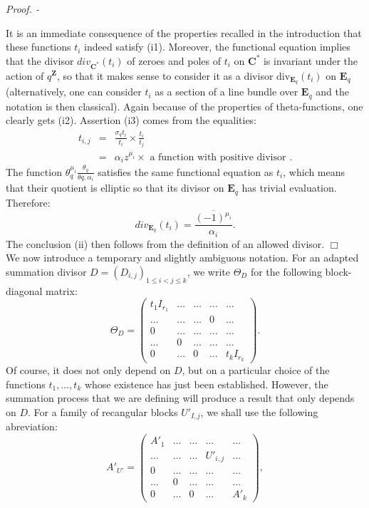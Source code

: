 \documentclass[english]{smfart}
\numberwithin{equation}{thm}
\def \Pr {\textsl{Proof. - }}
\def\sq{\sigma_q}
\def\C{{\mathbf C}}
\def\Z{{\mathbf Z}}
\def\Eq{{\mathbf{E}_{q}}}
\def\th{\theta}
\def\Th{\Theta}
\def\div{\text{div}}
\begin{document}
\Pr 

It is an immediate consequence of the properties recalled in the
introduction that these functions $t_{i}$ indeed satisfy (i1).
Moreover, the functional equation implies that the divisor
$div_{\C^{*}}(t_{i})$ of zeroes and poles of $t_{i}$ on $\C^{*}$
is invariant under the action of $q^{\Z}$, so that it makes sense
to consider it as a divisor $\div_{\Eq}(t_{i})$ on $\Eq$
(alternatively, one can consider $t_{i}$ as a section of a line
bundle over $\Eq$ and the notation is then classical). Again
because of the properties of theta-functions, one clearly gets (i2).
Assertion (i3) comes from the equalities:
\begin{eqnarray*}
t_{i,j} & = & \frac{\sq t_{i}}{t_{i}} \times \frac{t_{i}}{t_{j}} \\ 
        & = & \alpha_{i} z^{\mu_{i}} \times 
\text{~a function with positive divisor~}.
\end{eqnarray*}
The function $\th_{q}^{\mu_{i}} \frac{\th_{q}}{\th{q,\alpha_{i}}}$ 
satisfies the same functional equation as $t_{i}$, which means that
their quotient is elliptic so that its divisor on $\Eq$ has trivial
evaluation. Therefore:
$$
div_{\Eq}(t_{i}) = \overline{\frac{(-1)^{\mu_{i}}}{\alpha_{i}}}.
$$
The conclusion (ii) then follows from the definition of an allowed divisor.
\hfill $\Box$ \\

We now introduce a temporary and slightly ambiguous notation.
For an adapted summation divisor $D = (D_{i,j})_{1 \leq i < j \leq k}$,
we write $\Th_{D}$ for the following block-diagonal matrix:
$$
\Th_{D} = 
\begin{pmatrix}
t_{1} I_{r_{1}}  & \ldots & \ldots & \ldots & \ldots \\
\ldots & \ldots & \ldots  & 0 & \ldots \\
0      & \ldots & \ldots   & \ldots & \ldots \\
\ldots & 0 & \ldots  & \ldots & \ldots \\
0      & \ldots & 0       & \ldots & t_{k} I_{r_{k}}    
\end{pmatrix}.
$$
Of course, it does not only depend on $D$, but on a particular
choice of the functions $t_{1},\ldots,t_{k}$ whose existence
has just been established. However, the summation process
that we are defining will produce a result that only depends on $D$.
For a family of recangular blocks $U'_{I,j}$, we shall use the 
following abreviation:
$$
A'_{U'} =
\begin{pmatrix}
A'_{1}  & \ldots & \ldots & \ldots & \ldots \\
\ldots & \ldots & \ldots  & U'_{i,j} & \ldots \\
0      & \ldots & \ldots   & \ldots & \ldots \\
\ldots & 0 & \ldots  & \ldots & \ldots \\
0      & \ldots & 0       & \ldots & A'_{k}    
\end{pmatrix},
$$
\end{document}
